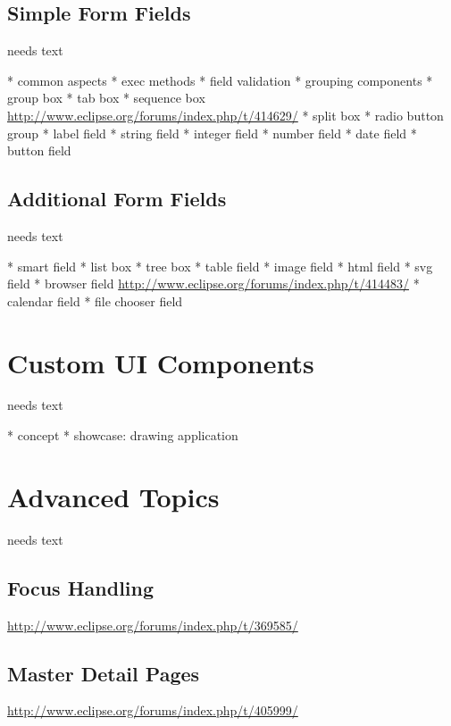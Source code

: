 \documentclass[a4paper,10pt,twoside]{book}
\begin{document}
\section{Simple Form Fields}
needs text

    * common aspects
	  * exec methods
	  * field validation
	* grouping components
	  * group box
	  * tab box
	  * sequence box \url{http://www.eclipse.org/forums/index.php/t/414629/}
	  * split box
      * radio button group
	* label field
	* string field
	* integer field
	* number field
	* date field
	* button field

\section{Additional Form Fields}
needs text

	* smart field
	* list box
	* tree box
	* table field
	* image field	
	* html field
	* svg field
	* browser field \url{http://www.eclipse.org/forums/index.php/t/414483/}
	* calendar field
	* file chooser field
  

\chapter{Custom UI Components}
needs text

  * concept
  * showcase: drawing application
    
\chapter{Advanced Topics}
needs text

\section{Focus Handling}
\url{http://www.eclipse.org/forums/index.php/t/369585/}

\section{Master Detail Pages}
\url{http://www.eclipse.org/forums/index.php/t/405999/}
\end{document}
